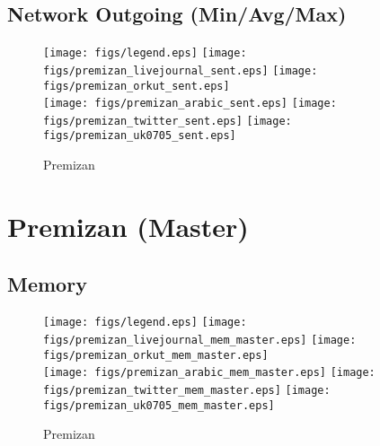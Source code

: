 \documentclass{article}
\newcommand{\bline}[1][1]{\vspace{#1\baselineskip}}
\begin{document}
\pagebreak
\subsection{Network Outgoing (Min/Avg/Max)}
\begin{figure}[!h]
  \bline[1]
  \centering
  \texttt{[image: figs/legend.eps]}\hspace{3em}%
  \texttt{[image: figs/premizan\_livejournal\_sent.eps]}\hspace{1em}%
  \texttt{[image: figs/premizan\_orkut\_sent.eps]}\\
  \texttt{[image: figs/premizan\_arabic\_sent.eps]}\hspace{1em}%
  \texttt{[image: figs/premizan\_twitter\_sent.eps]}\hspace{1em}%
  \texttt{[image: figs/premizan\_uk0705\_sent.eps]}
  \caption{Premizan}
\end{figure}


\pagebreak
\section{Premizan (Master)}
\label{sec:premizan-master}
\subsection{Memory}
\begin{figure}[!h]
  \centering
  \texttt{[image: figs/legend.eps]}\hspace{3em}%
  \texttt{[image: figs/premizan\_livejournal\_mem\_master.eps]}\hspace{1em}%
  \texttt{[image: figs/premizan\_orkut\_mem\_master.eps]}\\
  \texttt{[image: figs/premizan\_arabic\_mem\_master.eps]}\hspace{1em}%
  \texttt{[image: figs/premizan\_twitter\_mem\_master.eps]}\hspace{1em}%
  \texttt{[image: figs/premizan\_uk0705\_mem\_master.eps]}
  \caption{Premizan}
\end{figure}

\pagebreak
\end{document}
